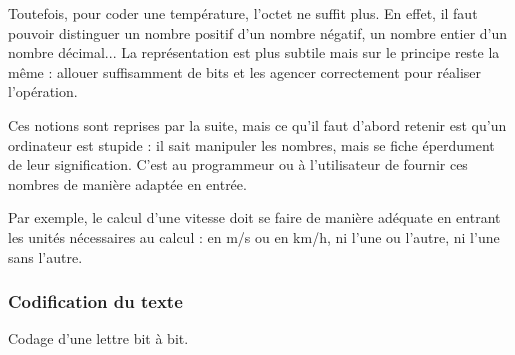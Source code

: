 Toutefois, pour coder une température, l'octet ne suffit plus. En effet, il faut pouvoir distinguer un nombre positif d'un nombre négatif, un nombre entier d'un nombre décimal... La représentation est plus subtile mais sur le principe reste la même : allouer suffisamment de bits et les agencer correctement pour réaliser l'opération.

Ces notions sont reprises par la suite, mais ce qu'il faut d'abord re\-tenir est qu'un ordinateur est stupide : il sait manipuler les nombres, mais se fiche éperdument de leur signification. C'est au programmeur ou à l'utilisateur de fournir ces nombres de manière adaptée en entrée.

Par exemple, le calcul d'une vitesse doit se faire de manière adéquate en entrant les unités nécessaires au calcul : en m/s ou en km/h, ni l'une ou l'autre, ni l'une sans l'autre.


\subsubsection[Codification du texte]{Codification du texte}
\label{subsub:V.1.2.2}

\begin{marginfigure}%
\caption{\label{fig:V.3}Codage d'une lettre bit à bit.}
\end{marginfigure}

